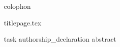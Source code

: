 
\maketitle%
{colophon}

\makeatletter
    \subtitle{An alternative title page style}
    {titlepage.tex}
\makeatother

\maketitle%

\frontmatter%

{task}
{authorship_declaration}
{abstract}


\tableofcontents

\addchap{\glossaryname}%
\label{ch:glossary}

